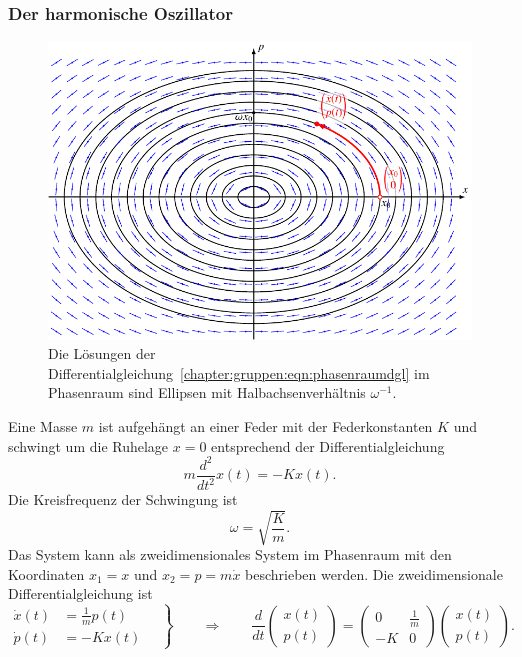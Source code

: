 \subsubsection{Der harmonische Oszillator}
\label{buch:gruppen:harmonischer-oszillator}
%
%
\begin{figure}
\centering
\includegraphics{chapters/60-gruppen/images/phasenraum.pdf}
\caption{Die Lösungen der
Differentialgleichung~\eqref{chapter:gruppen:eqn:phasenraumdgl}
im Phasenraum sind Ellipsen mit Halbachsenverhältnis $\omega^{-1}$.
\label{chapter:gruppen:fig:phasenraum}}
\end{figure}
Eine Masse $m$ ist aufgehängt an einer Feder mit der Federkonstanten $K$
%
und
schwingt um die Ruhelage $x=0$ entsprechend der Differentialgleichung
\[
m\frac{d^2}{dt^2} x(t) =  -Kx(t).
\]
Die Kreisfrequenz der Schwingung ist
%
%
\[
\omega = \sqrt{\frac{K}{m}}.
\]
Das System kann als zweidimensionales System im Phasenraum mit den 
Koordinaten $x_1=x$ und $x_2=p=m\dot{x}$ beschrieben werden.
Die zweidimensionale Differentialgleichung ist
%
\begin{equation}
\left.
\begin{aligned}
\dot{x}(t) &= \frac{1}{m}p(t)\\
\dot{p}(t) &= -Kx(t) 
\end{aligned}
\quad
\right\}
\qquad\Rightarrow\qquad
\frac{d}{dt}
\begin{pmatrix}x(t)\\p(t)\end{pmatrix}
=
\begin{pmatrix}
0&\frac{1}{m}\\
-K&0
\end{pmatrix}
\begin{pmatrix}x(t)\\p(t)\end{pmatrix}.
\label{chapter:gruppen:eqn:phasenraumdgl}
\end{equation}

